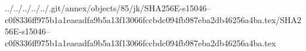 ../../../../../.git/annex/objects/85/jk/SHA256E-s15046--c0f8336ff975b1a1eaeadfa9b5a13f13066fccbdc094fb987eba2db46256a4ba.tex/SHA256E-s15046--c0f8336ff975b1a1eaeadfa9b5a13f13066fccbdc094fb987eba2db46256a4ba.tex